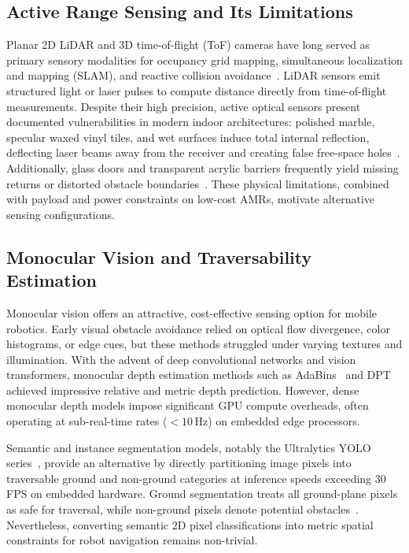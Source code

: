 \documentclass[preprint,12pt]{elsarticle}
\begin{document}
\subsection{Active Range Sensing and Its Limitations}
Planar 2D LiDAR and 3D time-of-flight (ToF) cameras have long served as primary sensory modalities for occupancy grid mapping, simultaneous localization and mapping (SLAM), and reactive collision avoidance~\cite{li_2020_lidar,thrun_2010_probabilistic,elfes_1989_using}. LiDAR sensors emit structured light or laser pulses to compute distance directly from time-of-flight measurements. Despite their high precision, active optical sensors present documented vulnerabilities in modern indoor architectures: polished marble, specular waxed vinyl tiles, and wet surfaces induce total internal reflection, deflecting laser beams away from the receiver and creating false free-space holes~\cite{deepthadamodaran_2023_experimental,yang_2011_on}. Additionally, glass doors and transparent acrylic barriers frequently yield missing returns or distorted obstacle boundaries~\cite{tibebu_2021_lidarbased,wang_2017_detecting}. These physical limitations, combined with payload and power constraints on low-cost AMRs, motivate alternative sensing configurations.

\subsection{Monocular Vision and Traversability Estimation}
Monocular vision offers an attractive, cost-effective sensing option for mobile robotics. Early visual obstacle avoidance relied on optical flow divergence, color histograms, or edge cues, but these methods struggled under varying textures and illumination. With the advent of deep convolutional networks and vision transformers, monocular depth estimation methods such as AdaBins~\cite{shariqfarooqbhat_2021_adabins} and DPT~\cite{ranftl_2021_vision} achieved impressive relative and metric depth prediction. However, dense monocular depth models impose significant GPU compute overheads, often operating at sub-real-time rates ($<10$\,Hz) on embedded edge processors.

Semantic and instance segmentation models, notably the Ultralytics YOLO series~\cite{ultralytics_2024_ultralytics}, provide an alternative by directly partitioning image pixels into traversable ground and non-ground categories at inference speeds exceeding 30\,FPS on embedded hardware. Ground segmentation treats all ground-plane pixels as safe for traversal, while non-ground pixels denote potential obstacles~\cite{wang_2021_a,dang_2023_obstacle}. Nevertheless, converting semantic 2D pixel classifications into metric spatial constraints for robot navigation remains non-trivial.
\end{document}
